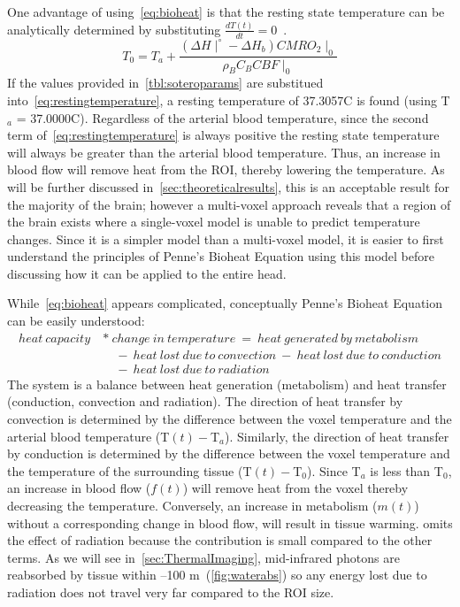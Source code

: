     One advantage of using~\cref{eq:bioheat} is that the resting state temperature can be analytically determined by substituting $\frac{dT(t)}{dt} = 0$~\citep{sotero2011}.
    \begin{equation}
      \label{eq:restingtemperature}
      T_{0} = T_{a} + \frac{(\Delta H \mid^{\circ} - \Delta H_{b}) CMRO_{2}\mid_{0}}{\rho_{B} C_{B} CBF\mid_{0}}
    \end{equation}
    If the values provided in~\cref{tbl:soteroparams} are substitued into~\cref{eq:restingtemperature}, a resting temperature of 37.3057\degree C is found (using T$_a$ = 37.0000\degree C).  Regardless of the arterial blood temperature, since the second term of~\cref{eq:restingtemperature} is always positive the resting state temperature will always be greater than the arterial blood temperature. Thus, an increase in blood flow will remove heat from the ROI, thereby lowering the temperature. As will be further discussed in~\cref{sec:theoreticalresults}, this is an acceptable result for the majority of the brain; however a multi-voxel approach reveals that a region of the brain exists where a single-voxel model is unable to predict temperature changes.  Since it is a simpler model than a multi-voxel model, it is easier to first understand the principles of Penne's Bioheat Equation using this model before discussing how it can be applied to the entire head. 
    
    While~\cref{eq:bioheat} appears complicated, conceptually Penne's Bioheat Equation can be easily understood:
    \begin{align}    
      \label{eq:soteroexplaiend}
      heat\ capacity\ &*\ change\ in\ temperature\ =\ heat\ generated\ by\ metabolism\nonumber \\ 
      &\quad {} -\ heat\ lost\ due\ to\ convection\ -\ heat\ lost\ due\ to\ conduction\nonumber\\ 
      &\quad {}  -\ heat\ lost\ due\ to\ radiation\
    \end{align}
    The system is a balance between heat generation (metabolism) and heat transfer (conduction, convection and radiation).  The direction of heat transfer by convection is determined by the difference between the voxel temperature and the arterial blood temperature (T$(t) - $T$_a$).  Similarly, the direction of heat transfer by conduction is determined by the difference between the voxel temperature and the temperature of the surrounding tissue (T$(t) - $T$_0$).  Since T$_a$ is less than T$_0$, an increase in blood flow ($f(t)$) will remove heat from the voxel thereby decreasing the temperature.  Conversely, an increase in metabolism ($m(t)$) without a corresponding change in blood flow, will result in tissue warming.   omits the effect of radiation because the contribution is small compared to the other terms.  As we will see in~\cref{sec:ThermalImaging}, mid-infrared photons are reabsorbed by tissue within --100 \textmu m~(\cref{fig:waterabs}) so any energy lost due to radiation does not travel very far compared to the ROI size.
    
